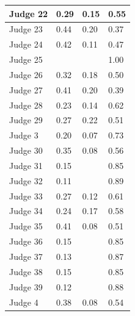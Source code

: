 \documentclass[11pt]{article}
\begin{document}
\begin{table}[H]
\begin{tabular}{|l|l|l|l|}
      Judge 22         & 0.29            & 0.15             & 0.55                 \\ \hline
      Judge 23         & 0.44            & 0.20             & 0.37                 \\ \hline
      Judge 24         & 0.42            & 0.11             & 0.47                 \\ \hline
      Judge 25         &                 &                  & 1.00                 \\ \hline
      Judge 26         & 0.32            & 0.18             & 0.50                 \\ \hline
      Judge 27         & 0.41            & 0.20             & 0.39                 \\ \hline
      Judge 28         & 0.23            & 0.14             & 0.62                 \\ \hline
      Judge 29         & 0.27            & 0.22             & 0.51                 \\ \hline
      Judge 3          & 0.20            & 0.07             & 0.73                 \\ \hline
      Judge 30         & 0.35            & 0.08             & 0.56                 \\ \hline
      Judge 31         & 0.15            &                  & 0.85                 \\ \hline
      Judge 32         & 0.11            &                  & 0.89                 \\ \hline
      Judge 33         & 0.27            & 0.12             & 0.61                 \\ \hline
      Judge 34         & 0.24            & 0.17             & 0.58                 \\ \hline
      Judge 35         & 0.41            & 0.08             & 0.51                 \\ \hline
      Judge 36         & 0.15            &                  & 0.85                 \\ \hline
      Judge 37         & 0.13            &                  & 0.87                 \\ \hline
      Judge 38         & 0.15            &                  & 0.85                 \\ \hline
      Judge 39         & 0.12            &                  & 0.88                 \\ \hline
      Judge 4          & 0.38            & 0.08             & 0.54                 \\ \hline

\end{tabular}
\end{table}
\end{document}
